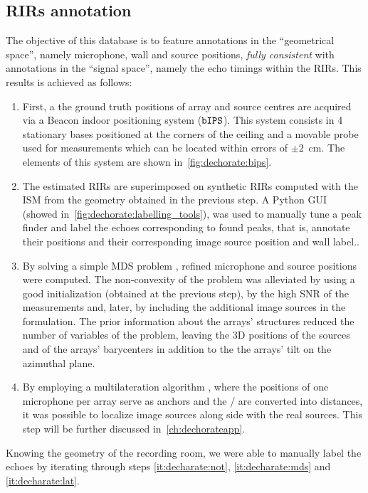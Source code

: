 \subsection{RIRs annotation}
The objective of this database is to feature annotations in the ``geometrical space'', namely microphone, wall and source positions, \textit{fully consistent} with annotations in the ``signal space'', namely the echo timings within the \acp{RIR}.
This results is achieved as follows:
\begin{enumerate}[label=(\roman*)]
    \item \label{it:decharate:ips} First, a the ground truth positions of array and source centres are acquired via a Beacon indoor positioning system ($\mathtt{bIPS}$).
    This system consists in 4 stationary bases positioned at the corners of the ceiling and a movable probe used for measurements which can be located within errors of $\pm2$~cm.
    The elements of this system are shown in~\cref{fig:dechorate:bips}.
    \item \label{it:decharate:not} The estimated \acp{RIR} are superimposed on synthetic \acp{RIR} computed with the \acf{ISM} from the geometry obtained in the previous step.
    A Python GUI (showed in~\cref{fig:dechorate:labelling_tools}), was used to manually tune a peak finder and label the echoes corresponding to found peaks, that is, annotate their positions and their corresponding image source position and wall label..

    \item \label{it:decharate:mds} By solving a simple \acf{MDS} problem , refined microphone and source positions were computed.
    The non-convexity of the problem was alleviated by using a good initialization (obtained at the previous step), by the high SNR of the measurements and, later, by including the additional image sources in the formulation.
    The prior information about the arrays' structures reduced the number of variables of the problem, leaving the 3D positions of the sources and of the arrays' barycenters in addition to the the arrays' tilt on the azimuthal plane.

    \item \label{it:decharate:lat} By employing a multilateration algorithm , where the positions of one microphone per array serve as anchors and the \TOAs/ are converted into distances, it was possible to localize image sources along side with the real sources.
    This step will be further discussed in~\cref{ch:dechorateapp}.
\end{enumerate}
Knowing the geometry of the recording room, we were able to manually label the echoes by iterating through steps \ref{it:decharate:not}, \ref{it:decharate:mds} and \ref{it:decharate:lat}.

